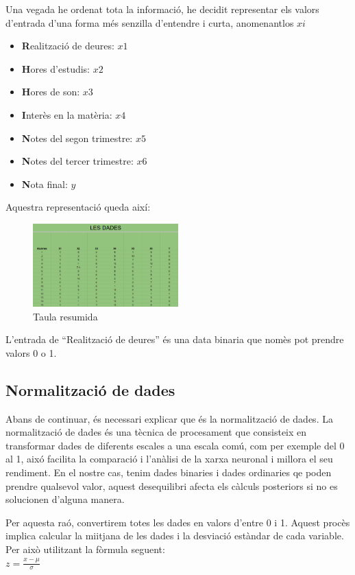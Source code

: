 Una vegada he ordenat tota la informació, he decidit representar els valors d'entrada d'una forma més senzilla d'entendre i curta, anomenantlos $xi$
\begin{itemize}
 \item \textbf Realització de deures: $x1$
 \item \textbf Hores d'estudis: $x2$
 \item \textbf Hores de son: $x3$
 \item \textbf Interès en la matèria: $x4$
 \item \textbf Notes del segon trimestre: $x5$
 \item \textbf Notes del tercer trimestre: $x6$
 \item \textbf Nota final: $y$
\end{itemize}

Aquestra representació queda així:

\begin{figure}[H]
    \centering
    \includegraphics[width=0.5\textwidth]{./figures/Dades_resumides.png}
    \caption{Taula resumida}
\end{figure}

L'entrada de ``Realització de deures'' és una data binaria que nomès pot prendre valors 0 o 1.
\subsection{Normalització de dades}
Abans de continuar, és necessari explicar que és la normalització de dades.
La normalització de dades és una tècnica de procesament que consisteix en transformar dades de diferents escales a una escala comú, com per exemple del 0 al 1, aixó facilita la comparació i l'anàlisi de la xarxa neuronal i millora el seu rendiment. En el nostre cas, tenim dades binaries i dades ordinaries qe poden prendre qualsevol valor, aquest desequilibri afecta els càlculs posteriors si no es solucionen d'alguna manera.

Per aquesta raó, convertirem totes les dades en valors d'entre 0 i 1. Aquest procès implica calcular la miitjana de les dades i la desviació estàndar de cada variable. Per això utilitzant la fòrmula seguent:\\
$z = \frac{x - \mu}{\sigma}$\\

